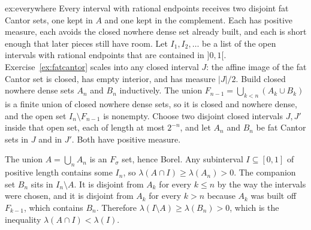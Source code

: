 \begin{solution}{ex:everywhere}
\idea Every interval with rational endpoints receives two disjoint fat Cantor sets, one kept in $A$ and one kept in the complement.
Each has positive measure, each avoids the closed nowhere dense set already built, and each is short enough that later pieces still have room.
\writeup Let $I_1,I_2,\ldots$ be a list of the open intervals with rational endpoints that are contained in $]0,1[$.
Exercise~\ref{ex:fatcantor} scales into any closed interval $J$: the affine image of the fat Cantor set is closed, has empty interior, and has measure $|J|/2$.
Build closed nowhere dense sets $A_n$ and $B_n$ inductively.
The union $F_{n-1}=\bigcup_{k<n}(A_k\cup B_k)$ is a finite union of closed nowhere dense sets, so it is closed and nowhere dense, and the open set $I_n\setminus F_{n-1}$ is nonempty.
Choose two disjoint closed intervals $J,J'$ inside that open set, each of length at most $2^{-n}$, and let $A_n$ and $B_n$ be fat Cantor sets in $J$ and in $J'$.
Both have positive measure.

The union $A=\bigcup_n A_n$ is an $F_\sigma$ set, hence Borel.
Any subinterval $I\subseteq[0,1]$ of positive length contains some $I_n$, so $\lambda(A\cap I)\ge\lambda(A_n)>0$.
The companion set $B_n$ sits in $I_n\setminus A$.
It is disjoint from $A_k$ for every $k\le n$ by the way the intervals were chosen, and it is disjoint from $A_k$ for every $k>n$ because $A_k$ was built off $F_{k-1}$, which contains $B_n$.
Therefore $\lambda(I\setminus A)\ge\lambda(B_n)>0$, which is the inequality $\lambda(A\cap I)<\lambda(I)$.
\end{solution}

